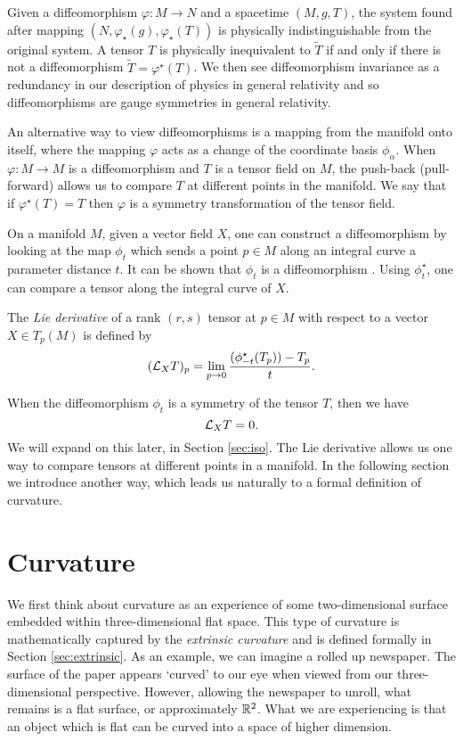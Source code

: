 Given a diffeomorphism $\varphi: M \rightarrow N$ and a spacetime $(M,g,T)$, the system found after mapping $(N, \varphi_\star (g), \varphi_\star (T))$ is physically indistinguishable from the original system. A tensor $T$ is physically inequivalent to $\tilde{T}$ if and only if there is not a diffeomorphism $\tilde{T} = \varphi^\star(T)$. We then see diffeomorphism invariance as a redundancy in our description of physics in general relativity and so diffeomorphisms are gauge symmetries in general relativity. 

An alternative way to view diffeomorphisms is a mapping from the manifold onto itself, where the mapping $\varphi$ acts as a change of the coordinate basis $\phi_\alpha$. When $\varphi: M \rightarrow M$ is a diffeomorphism and $T$ is a tensor field on $M$, the push-back (pull-forward) allows us to compare $T$ at different points in the manifold. We say that if $\varphi^\star (T) = T$ then $\varphi$ is a symmetry transformation of the tensor field. 

On a manifold $M$, given a vector field $X$, one can construct a diffeomorphism by looking at the map $\phi_t$ which sends a point $p \in M$ along an integral curve a parameter distance $t$. It can be shown that $\phi_t$ is a diffeomorphism \cite{frankel_2011}. Using $\phi_t^\star$, one can compare a tensor along the integral curve of $X$.
\begin{defn}
	The \emph{Lie derivative} of a rank $(r,s)$ tensor at $p \in M$ with respect to a vector $X \in T_p(M)$ is defined by
	\begin{equation}
	\label{eq:liederivative}
		({\cal L}_X T)_p = \lim_{p \rightarrow 0} \frac{(\phi_{-t}^\star (T_p)) - T_p}{t} .
	\end{equation}
\end{defn}
When the diffeomorphism $\phi_t$ is a symmetry of the tensor $T$, then we have
\begin{equation*}
	{\cal L}_X T = 0.
\end{equation*}
We will expand on this later, in Section \ref{sec:iso}. The Lie derivative allows us one way to compare tensors at different points in a manifold. In the following section we introduce another way, which leads us naturally to a formal definition of curvature.

\section{Curvature}

We first think about curvature as an experience of some two-dimensional surface embedded within three-dimensional flat space. This type of curvature is mathematically captured by the \emph{extrinsic curvature} and is defined formally in Section \ref{sec:extrinsic}. As an example, we can imagine a rolled up newspaper. The surface of the paper appears `curved' to our eye when viewed from our three-dimensional perspective. However,  allowing the newspaper to unroll, what remains is a flat surface, or approximately ${\mathbb{R}}^2$. What we are experiencing is that an object which is flat can be curved into a space of higher dimension. 

